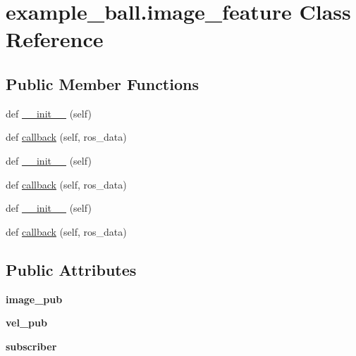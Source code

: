 \hypertarget{classexample__ball_1_1image__feature}{}\section{example\+\_\+ball.\+image\+\_\+feature Class Reference}
\label{classexample__ball_1_1image__feature}
\subsection*{Public Member Functions}
\begin{DoxyCompactItemize}
\item 
def \hyperlink{classexample__ball_1_1image__feature_a763c2126c33347904853ec4193273b8e}{\+\_\+\+\_\+init\+\_\+\+\_\+} (self)
\item 
def \hyperlink{classexample__ball_1_1image__feature_ab9332c62c4aafa56c99505cac8173e84}{callback} (self, ros\+\_\+data)
\item 
def \hyperlink{classexample__ball_1_1image__feature_a763c2126c33347904853ec4193273b8e}{\+\_\+\+\_\+init\+\_\+\+\_\+} (self)
\item 
def \hyperlink{classexample__ball_1_1image__feature_ab9332c62c4aafa56c99505cac8173e84}{callback} (self, ros\+\_\+data)
\item 
def \hyperlink{classexample__ball_1_1image__feature_a763c2126c33347904853ec4193273b8e}{\+\_\+\+\_\+init\+\_\+\+\_\+} (self)
\item 
def \hyperlink{classexample__ball_1_1image__feature_ab9332c62c4aafa56c99505cac8173e84}{callback} (self, ros\+\_\+data)
\end{DoxyCompactItemize}
\subsection*{Public Attributes}
\begin{DoxyCompactItemize}
\item 
\mbox{\label{classexample__ball_1_1image__feature_a697c97b3884acc64a666669958d608e9}} 
{\bfseries image\+\_\+pub}
\item 
\mbox{\label{classexample__ball_1_1image__feature_ae5fac8ed2fec95438e6f9c7311a9eb33}} 
{\bfseries vel\+\_\+pub}
\item 
\mbox{\label{classexample__ball_1_1image__feature_a07d6638ec4f36520db54a45aed05bb64}} 
{\bfseries subscriber}
\end{DoxyCompactItemize}
